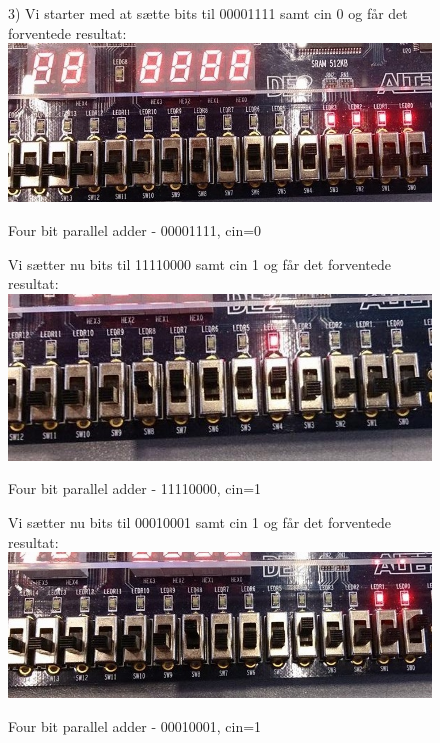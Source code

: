 \begin{enumerate}
	\begin{figure}[H]
		\item[3)]
		Vi starter med at sætte bits til 00001111 samt cin 0 og får det forventede resultat:
		\centering
		\includegraphics[scale=0.5]{pictures/Oevelse3/00001111_cin0.jpg}
		\caption{Four bit parallel adder - 00001111, cin=0}
		\label{fig:4bitFa00001111cin0}
	\end{figure}

	\begin{figure}[H]
Vi sætter nu bits til 11110000 samt cin 1 og får det forventede resultat:
		\centering
		\includegraphics[scale=0.5]{pictures/Oevelse3/11110000_cin1.jpg}
		\caption{Four bit parallel adder - 11110000, cin=1}
		\label{fig:4bitFa11110000cin1}
	\end{figure}


	\begin{figure}[H]
			Vi sætter nu bits til 00010001 samt cin 1 og får det forventede resultat:
			\centering
			\includegraphics[scale=0.5]{pictures/Oevelse3/00010001_cin1.jpg}
			\caption{Four bit parallel adder - 00010001, cin=1}
			\label{fig:4bitFa00010001cin1}
		\end{figure}
		
\end{enumerate}